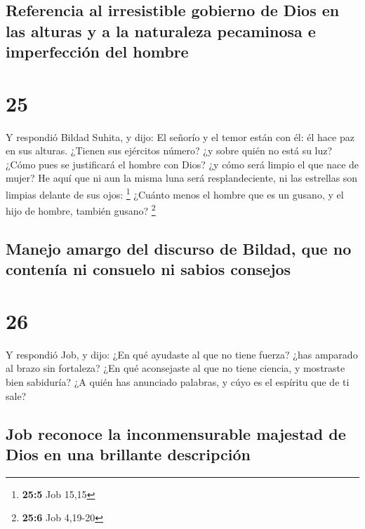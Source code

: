 \hypertarget{referencia-al-irresistible-gobierno-de-dios-en-las-alturas-y-a-la-naturaleza-pecaminosa-e-imperfecciuxf3n-del-hombre}{%
\subsection{Referencia al irresistible gobierno de Dios en las alturas y
a la naturaleza pecaminosa e imperfección del
hombre}\label{referencia-al-irresistible-gobierno-de-dios-en-las-alturas-y-a-la-naturaleza-pecaminosa-e-imperfecciuxf3n-del-hombre}}

\hypertarget{section-24}{%
\section{25}\label{section-24}}

 Y respondió Bildad Suhita, y dijo:  El señorío
y el temor están con él: él hace paz en sus alturas. 
¿Tienen sus ejércitos número? ¿y sobre quién no está su luz?
 ¿Cómo pues se justificará el hombre con Dios? ¿y cómo será
limpio el que nace de mujer?  He aquí que ni aun la misma
luna será resplandeciente, ni las estrellas son limpias delante de sus
ojos: \footnote{\textbf{25:5} Job 15,15}  ¿Cuánto menos el
hombre que es un gusano, y el hijo de hombre, también gusano?
\footnote{\textbf{25:6} Job 4,19-20}

\hypertarget{manejo-amargo-del-discurso-de-bildad-que-no-contenuxeda-ni-consuelo-ni-sabios-consejos}{%
\subsection{Manejo amargo del discurso de Bildad, que no contenía ni
consuelo ni sabios
consejos}\label{manejo-amargo-del-discurso-de-bildad-que-no-contenuxeda-ni-consuelo-ni-sabios-consejos}}

\hypertarget{section-25}{%
\section{26}\label{section-25}}

 Y respondió Job, y dijo:  ¿En qué ayudaste al
que no tiene fuerza? ¿has amparado al brazo sin fortaleza? 
¿En qué aconsejaste al que no tiene ciencia, y mostraste bien sabiduría?
 ¿A quién has anunciado palabras, y cúyo es el espíritu que
de ti sale?

\hypertarget{job-reconoce-la-inconmensurable-majestad-de-dios-en-una-brillante-descripciuxf3n}{%
\subsection{Job reconoce la inconmensurable majestad de Dios en una
brillante
descripción}\label{job-reconoce-la-inconmensurable-majestad-de-dios-en-una-brillante-descripciuxf3n}}

